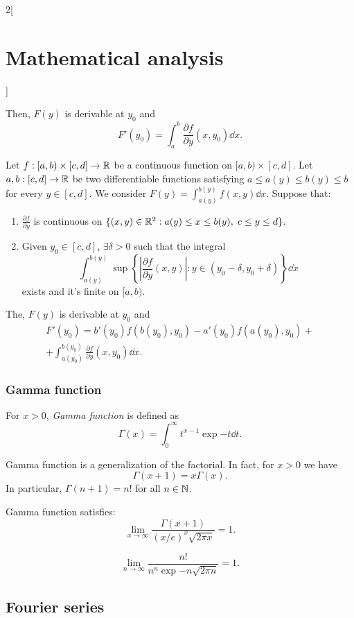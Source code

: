\documentclass[../../../main.tex]{subfiles}
\begin{document}
\begin{multicols}{2}[\section{Mathematical analysis}]
\begin{theorem}
\begin{enumerate}
\end{enumerate} 
Then, $F(y)$ is derivable at $y_0$ and $$F'(y_0)=\int_a^b\frac{\partial f}{\partial y}(x,y_0)\dd x.$$
\end{theorem}
\begin{theorem}
Let $f:[a,b)\times[c,d]\rightarrow\mathbb{R} $ be a continuous function on $[a,b)\times[c,d]$. Let $a,b:[c,d]\rightarrow\mathbb{R} $ be two differentiable functions satisfying $a\leq a(y)\leq b(y)\leq b$ for every $y\in[c,d]$. We consider $\displaystyle F(y)=\int_{a(y)}^{b(y)}f(x,y)\dd x$. Suppose that:
\begin{enumerate}
    \item $\displaystyle\frac{\partial f}{\partial y}$ is continuous on $\{(x,y)\in\mathbb{R} ^2:a(y)\leq x\leq b(y),\; c\leq y\leq d\}$.
    \item Given $y_0\in[c,d]$, $\exists\delta>0$ such that the integral $$\int_{a(y)}^{b(y)}\sup\left\{\left|\frac{\partial f}{\partial y}(x,y)\right|:y\in(y_0-\delta,y_0+\delta)\right\}\dd x$$ exists and it's finite on $[a,b)$.
\end{enumerate} 
The, $F(y)$ is derivable at $y_0$ and \begin{multline*}
    F'(y_0)=b'(y_0)f(b(y_0),y_0)-a'(y_0)f(a(y_0),y_0)+\\+\int_{a(y_0)}^{b(y_0)}\frac{\partial f}{\partial y}(x,y_0)\dd x.
\end{multline*}
\end{theorem}
\subsubsection*{Gamma function}
\begin{definition}
For $x>0$, \textit{Gamma function} is defined as $$\Gamma(x)=\int_0^\infty t^{x-1}\exp{-t}\dd t.$$
\end{definition}
\begin{theorem}
Gamma function is a generalization of the factorial. In fact, for $x>0$ we have $$\Gamma(x+1)=x\Gamma(x).$$ In particular, $\Gamma(n+1)=n!$ for all $n\in\mathbb{N} $.
\end{theorem}
\begin{theorem}
Gamma function satisfies: $$\lim_{x\to\infty}\frac{\Gamma(x+1)}{(x/e)^x\sqrt{2\pi x}}=1.$$
\end{theorem}
\begin{corollary}
$$\lim_{n\to\infty}\frac{n!}{n^n\exp{-n}\sqrt{2\pi n}}=1.$$
\end{corollary}
\subsection{Fourier series}

\end{multicols}
\end{document}
